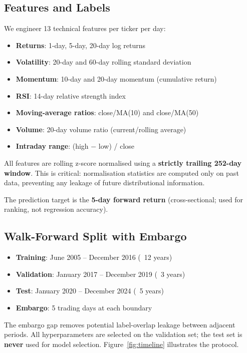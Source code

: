 \documentclass[11pt]{article}
\begin{document}
\subsection{Features and Labels}

We engineer 13 technical features per ticker per day:

\begin{itemize}[leftmargin=1.4em]
  \item \textbf{Returns}: 1-day, 5-day, 20-day log returns
  \item \textbf{Volatility}: 20-day and 60-day rolling standard deviation
  \item \textbf{Momentum}: 10-day and 20-day momentum (cumulative return)
  \item \textbf{RSI}: 14-day relative strength index
  \item \textbf{Moving-average ratios}: close/MA(10) and close/MA(50)
  \item \textbf{Volume}: 20-day volume ratio (current/rolling average)
  \item \textbf{Intraday range}: (high $-$ low) / close
\end{itemize}

All features are rolling z-score normalised using a \textbf{strictly trailing 252-day window}.
This is critical: normalisation statistics are computed only on past data, preventing any leakage of future distributional information.

The prediction target is the \textbf{5-day forward return} (cross-sectional; used for ranking, not regression accuracy).

\subsection{Walk-Forward Split with Embargo}

\begin{itemize}[leftmargin=1.4em]
  \item \textbf{Training}: June 2005 -- December 2016 (~12 years)
  \item \textbf{Validation}: January 2017 -- December 2019 (~3 years)
  \item \textbf{Test}: January 2020 -- December 2024 (~5 years)
  \item \textbf{Embargo}: 5 trading days at each boundary
\end{itemize}

The embargo gap removes potential label-overlap leakage between adjacent periods.
All hyperparameters are selected on the validation set; the test set is \textbf{never} used for model selection.
Figure~\ref{fig:timeline} illustrates the protocol.
\end{document}
